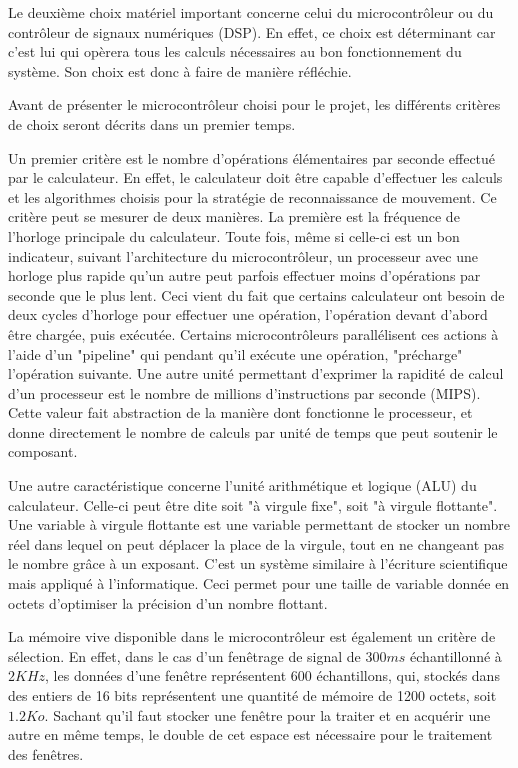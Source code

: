 \documentclass[letterpaper, twoside, 12pt, memoire, creativecommons, hyperref]{thETS}
\begin{document}
Le deuxième choix matériel important concerne celui du microcontrôleur ou du contrôleur de signaux numériques (DSP). En effet, ce choix est déterminant car c'est lui qui opèrera tous les calculs nécessaires au bon fonctionnement du système. Son choix est donc à faire de manière réfléchie. 

Avant de présenter le microcontrôleur choisi pour le projet, les différents critères de choix seront décrits dans un premier temps. 

Un premier critère est le nombre d'opérations élémentaires par seconde effectué par le calculateur. En effet, le calculateur doit être capable d'effectuer les calculs et les algorithmes choisis pour la stratégie de reconnaissance de mouvement. Ce critère peut se mesurer de deux manières. La première est la fréquence de l'horloge principale du calculateur. Toute fois, même si celle-ci est un bon indicateur, suivant l'architecture du microcontrôleur, un processeur avec une horloge plus rapide qu'un autre peut parfois effectuer moins d'opérations par seconde que le plus lent. Ceci vient du fait que certains calculateur ont besoin de deux cycles d'horloge pour effectuer une opération, l'opération devant d'abord être chargée, puis exécutée. Certains microcontrôleurs parallélisent ces actions à l'aide d'un "pipeline" qui pendant qu'il exécute une opération, "précharge" l'opération suivante. Une autre unité permettant d'exprimer la rapidité de calcul d'un processeur est le nombre de millions d'instructions par seconde (MIPS). Cette valeur fait abstraction de la manière dont fonctionne le processeur, et donne directement le nombre de calculs par unité de temps que peut soutenir le composant.

Une autre caractéristique concerne l'unité arithmétique et logique (ALU) du calculateur. Celle-ci peut être dite soit "à virgule fixe", soit "à virgule flottante". Une variable à virgule flottante est une variable permettant de stocker un nombre réel dans lequel on peut déplacer la place de la virgule, tout en ne changeant pas le nombre grâce à un exposant. C'est un système similaire à l'écriture scientifique mais appliqué à l'informatique. Ceci permet pour une taille de variable donnée en octets d'optimiser la précision d'un nombre flottant.

La mémoire vive disponible dans le microcontrôleur est également un critère de sélection. En effet, dans le cas d'un fenêtrage de signal de $300 ms$ échantillonné à $2 KHz$, les données  d'une fenêtre représentent 600 échantillons, qui, stockés dans des entiers de 16 bits représentent une quantité de mémoire de 1200 octets, soit $1.2 Ko$. Sachant qu'il faut stocker une fenêtre pour la traiter et en acquérir une autre en même temps, le double de cet espace est nécessaire pour le traitement des fenêtres. 
\end{document}
